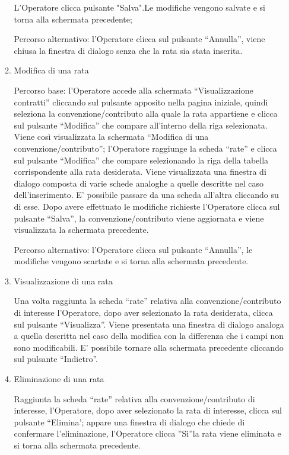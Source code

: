 \begin{enumerate}
\begin{enumerate}
L'Operatore clicca pulsante "Salva".Le modifiche vengono salvate e si torna alla schermata precedente;

Percorso alternativo:
l'Operatore clicca sul pulsante ``Annulla'', viene chiusa la finestra di dialogo senza che la rata sia stata inserita.

\item Modifica di una rata\\ \label{UC_edit_installment}

Percorso base:
l'Operatore accede alla schermata ``Visualizzazione contratti'' cliccando sul pulsante apposito nella pagina iniziale, quindi seleziona la convenzione/contributo alla quale la rata appartiene e clicca sul pulsante ``Modifica'' che compare
all'interno della riga selezionata. Viene così visualizzata la schermata ``Modifica di una convenzione/contributo''; l'Operatore raggiunge la scheda ``rate'' e clicca sul pulsante ``Modifica'' che compare selezionando la riga della tabella
corrispondente alla rata desiderata. Viene visualizzata una finestra di dialogo composta di varie schede analoghe a quelle descritte nel caso dell'inserimento. E' possibile passare da una scheda all'altra cliccando su di esse.
Dopo avere effettuato le modifiche richieste l'Operatore clicca sul pulsante ``Salva'', la convenzione/contributo viene aggiornata e viene visualizzata la schermata precedente.

Percorso alternativo:
l'Operatore clicca sul pulsante ``Annulla'', le modifiche vengono scartate e si torna alla schermata precedente.

\item Visualizzazione di una rata \label{UC_view_installment}

Una volta raggiunta la scheda ``rate'' relativa alla convenzione/contributo di interesse l'Operatore, dopo aver selezionato la rata desiderata, clicca sul pulsante ``Visualizza''. Viene presentata una finestra di dialogo analoga a quella descritta nel caso della modifica 
con la differenza che i campi non sono modificabili. E' possibile tornare alla schermata precedente cliccando sul pulsante ``Indietro''.

\item Eliminazione di una rata\\ \label{UC_delete_installment}

Raggiunta la scheda ``rate'' relativa alla convenzione/contributo di interesse, l'Operatore, dopo aver selezionato la rata di interesse, clicca sul pulsante ``Elimina'; appare una finestra di dialogo che chiede di confermare
l'eliminazione, l'Operatore clicca ''Sì''la rata viene eliminata e si torna alla schermata precedente.


\end{enumerate}
\end{enumerate}
